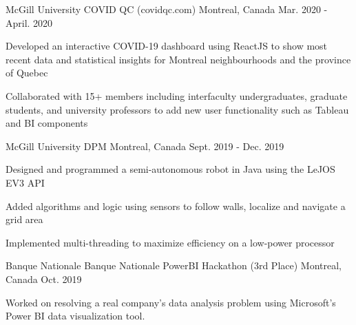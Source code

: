 

\begin{cventries}

  \cventry
    {McGill University} %
    {COVID QC (covidqc.com)} %
    {Montreal, Canada} %
    {Mar. 2020 - April. 2020} %
    {
      \begin{cvitems} %
        \item {Developed an interactive COVID-19 dashboard using ReactJS to show most recent data and statistical insights for Montreal neighbourhoods and the province of Quebec}
        \item {Collaborated with 15+ members including interfaculty undergraduates, graduate students, and university professors to add new user functionality such as Tableau and BI components}
      \end{cvitems}
    }

  \cventry
    {McGill University} %
    {DPM} %
    {Montreal, Canada} %
    {Sept. 2019 - Dec. 2019} %
    {
      \begin{cvitems} %
        \item {Designed and programmed a semi-autonomous robot in Java using the LeJOS EV3 API}
        \item {Added algorithms and logic using sensors to follow walls, localize and navigate a grid area }
        \item {Implemented multi-threading to maximize efficiency on a low-power processor}
      \end{cvitems}
    }

\cventry
    {Banque Nationale} %
    {Banque Nationale PowerBI Hackathon (3rd Place)} %
    {Montreal, Canada} %
    {Oct. 2019} %
    {
      \begin{cvitems} %
        \item {Worked on resolving a real company’s data analysis problem using Microsoft’s Power BI data visualization tool. }
      \end{cvitems}
    }
\end{cventries}
